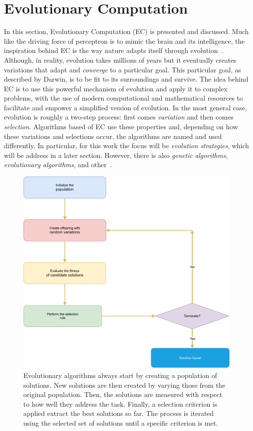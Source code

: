 \section{Evolutionary Computation}
In this section, Evolutionary Computation (EC) is presented and discussed. Much like the 
driving force of perceptron is to mimic the brain and its intelligence, the inspiration 
behind EC is the way nature adapts itself through 
evolution~\cite{fogelWhatEvolutionaryComputation2000}. Although, in reality, evolution 
takes millions of years but it eventually creates variations that adapt and \emph{converge} 
to a particular goal. This particular goal, as described by Darwin, is to be fit to its 
surroundings and survive. The idea behind EC is to use this powerful mechanism of evolution 
and apply it to complex problems, with the use of modern computational and mathematical 
resources to facilitate and empower a simplified version of evolution. In the most general 
case, evolution is roughly a two-step process: first comes \emph{variation} and then comes 
\emph{selection}. Algorithms based of EC use these properties and, depending on how these 
variations and selections occur, the algorithms are named and used differently. In 
particular, for this work the focus will be \emph{evolution strategies}, which will be 
address in a later section. However, there is also \emph{genetic algorithms}, 
\emph{evolutionary algorithms}, and other~\cite{kacprzykSpringerHandbookComputational2015}.

\begin{figure}
    \centering
    \includegraphics[scale=0.67]{figuras/capitulo-3/evolutionary-optimization.pdf}
    \caption{Evolutionary algorithms always start by creating a population of solutions. New solutions are then created by varying those from the original population. Then, the solutions are measured with respect to how well they address the task. Finally, a selection criterion is applied extract the best solutions so far. The process is iterated using the selected set of solutions until a specific criterion is met.}
    \label{fig:evolutionary-optimization}
\end{figure}

